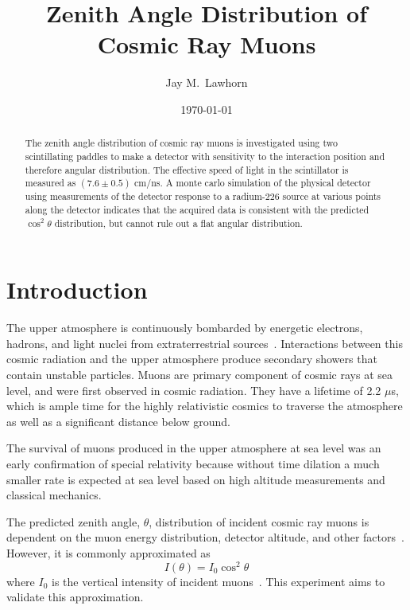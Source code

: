 \newcommand{\cd}{$\cdot$}

%
%


\title{Zenith Angle Distribution of Cosmic Ray Muons}
\author{Jay M.\ Lawhorn}
\date{\today}

\begin{abstract}
The zenith angle distribution of cosmic ray muons is investigated using two scintillating paddles to make a detector with sensitivity to the interaction position and therefore angular distribution. The effective speed of light in the scintillator is measured as $(7.6\pm0.5)$ cm/ns. A monte carlo simulation of the physical detector using measurements of the detector response to a radium-226 source at various points along the detector indicates that the acquired data is consistent with the predicted $\cos^{2}{\theta}$ distribution, but cannot rule out a flat angular distribution. 
\end{abstract}

\maketitle

\section{Introduction}

The upper atmosphere is continuously bombarded by energetic electrons, hadrons, and light nuclei from extraterrestrial sources~\cite{pdg}. Interactions between this cosmic radiation and the upper atmosphere produce secondary showers that contain unstable particles. Muons are primary component of cosmic rays at sea level, and were first observed in cosmic radiation. They have a lifetime of 2.2 $\mu$s, which is ample time for the highly relativistic cosmics to traverse the atmosphere as well as a significant distance below ground.

The survival of muons produced in the upper atmosphere at sea level was an early confirmation of special relativity because without time dilation a much smaller rate is expected at sea level based on high altitude measurements and classical mechanics. 

The predicted zenith angle, $\theta$, distribution of incident cosmic ray muons is dependent on the muon energy distribution, detector altitude, and other factors~\cite{pdg}. However, it is commonly approximated as 
\begin{equation}
I(\theta) = I_0 \cos^{2}{\theta}
\end{equation}
where $I_0$ is the vertical intensity of incident muons~\cite{kuo}. This experiment aims to validate this approximation. 

